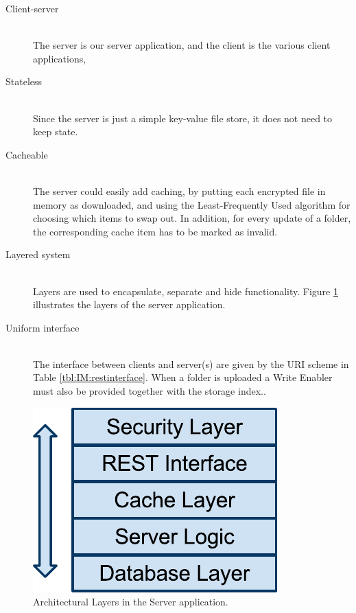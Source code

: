 \documentclass[pdftex,english,10pt,b5paper,twoside]{book}
\begin{document}
\begin{description}
  \item[Client-server] \hfill \\
    The server is our server application, and the client is the various client
    applications, 

  \item[Stateless] \hfill \\
    Since the server is just a simple key-value file store, it does
    not need to keep state.

  \item[Cacheable] \hfill \\
    The server could easily add caching, by putting each encrypted file in
    memory as downloaded, and using the Least-Frequently Used algorithm for
    choosing which items to swap out. In addition, for every update of a folder,
    the corresponding cache item has to be marked as invalid.

  \item[Layered system] \hfill \\
    Layers are used to encapsulate, separate and hide functionality.
    Figure \ref{fig:IM:layers} illustrates the layers of the server application.

  \item[Uniform interface] \hfill \\
    The interface between clients and server(s) are given by the URI scheme in
    Table \ref{tbl:IM:restinterface}. When a folder is uploaded a Write Enabler
    must also be provided together with the storage index..
\end{description}

\begin{figure}[h!]
    \centering
    \includegraphics[scale=0.6]{ImplementationServerLayers.pdf}
    \caption{Architectural Layers in the Server application.}
    \label{fig:IM:layers}
\end{figure}
\end{document}
